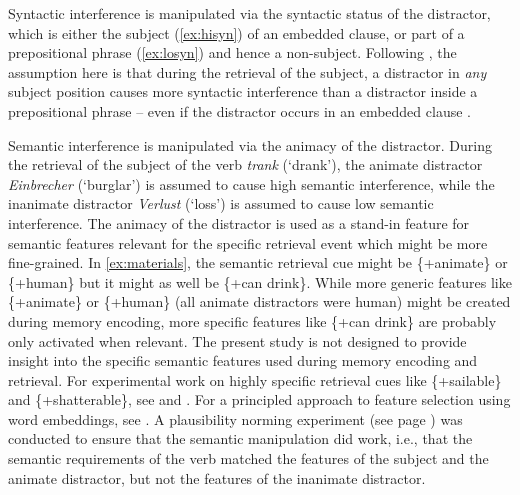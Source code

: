 \documentclass[review,preprint,12pt,authoryear,floatsintext]{elsarticle}
\begin{document}
Syntactic interference is manipulated via the syntactic status of the distractor, which is either the subject (\ref{ex:hisyn}) of an embedded clause, or part of a prepositional phrase (\ref{ex:losyn}) and hence a non-subject. {Following \cite{vandyke07}, the assumption here is that  during the retrieval of the subject, a distractor in \emph{any} subject position causes more syntactic interference than a distractor inside a prepositional phrase -- even if the distractor occurs in an embedded clause {\citep[this assumption stands in contrast to findings on so-called agreement attraction, where syntactic hierarchy plays a crucial role, see e.g.,][]{franck2002subject, franck2006agreement,franck2011_commentary, franck2020hierarchical}.}}\label{franck_refs}

Semantic interference is manipulated via the animacy of the distractor. During the retrieval of the subject of the verb \textit{trank} (`drank'), the animate distractor  \textit{Einbrecher} (`burglar') is assumed to cause high semantic interference, while the inanimate distractor \textit{Verlust} (`loss') is assumed to cause low semantic interference. {The animacy of the distractor is used as a stand-in feature for semantic features relevant for the specific retrieval event which might be more fine-grained. In \ref{ex:materials}, the semantic retrieval cue might be \{+animate\} or \{+human\} but it might as well be \{+can drink\}. While more generic features like \{+animate\} or \{+human\} (all animate distractors were human) might be created during memory encoding, more specific features like \{+can drink\} are probably only activated when relevant. The present study is not designed to provide insight into the specific semantic features used during memory encoding and retrieval. For experimental work on highly specific retrieval cues like \{+sailable\} and \{+shatterable\}, see \cite{vandyke_mcelree06} and \cite{cunnings_sturt_2018retrieval}. For a principled approach to feature selection using word embeddings, see \cite{smith2020principled}. A plausibility norming experiment (see page \pageref{plausib_normin_orig}) was conducted to ensure that the semantic manipulation did work, i.e., that the semantic requirements of the verb matched the features of the subject and the animate distractor, but not the features of the inanimate distractor.
}\label{semantic_features_encoding}
\end{document}

